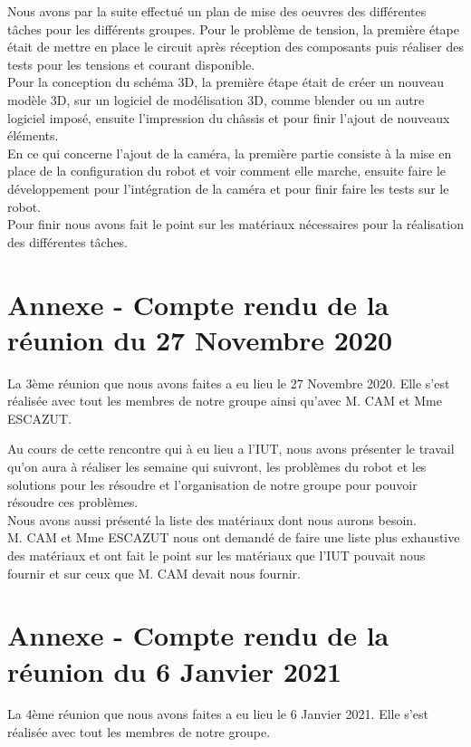 \documentclass{PackagerQualityN}
\begin{document}
Nous avons par la suite effectué un plan de mise des oeuvres des différentes tâches pour les différents groupes.
Pour le problème de tension, la première étape était de mettre en place le circuit après réception des composants puis réaliser des tests pour les tensions et courant disponible.
\\
Pour la conception du schéma 3D, la première étape était de créer un nouveau modèle 3D, sur un logiciel de modélisation 3D, comme blender ou un autre logiciel imposé, ensuite l'impression du châssis et pour finir l'ajout de nouveaux éléments.
\\
En ce qui concerne l'ajout de la caméra, la première partie consiste à la mise en place de la configuration du robot et voir comment elle marche, ensuite faire le développement pour l'intégration de la caméra et pour finir faire les tests sur le robot.
\\
Pour finir nous avons fait le point sur les matériaux nécessaires pour la réalisation des différentes tâches.

\newp
\section*{Annexe - Compte rendu de la réunion du 27 Novembre 2020}
La 3ème réunion que nous avons faites a eu lieu le 27 Novembre 2020. Elle s'est réalisée avec tout les membres de notre groupe ainsi qu'avec M. CAM et Mme ESCAZUT.

Au cours de cette rencontre qui à eu lieu a l'IUT, nous avons présenter le travail qu'on aura à réaliser les semaine qui suivront, les problèmes du robot et les solutions pour les résoudre et l'organisation de notre groupe pour pouvoir résoudre ces problèmes.
\\

Nous avons aussi présenté la liste des matériaux dont nous aurons besoin.
\\

M. CAM et Mme ESCAZUT nous ont demandé de faire une liste plus exhaustive des matériaux et ont fait le point sur les matériaux que l'IUT pouvait nous fournir et sur ceux que M. CAM devait nous fournir.


\newp
\section*{Annexe - Compte rendu de la réunion du 6 Janvier 2021}
La 4ème réunion que nous avons faites a eu lieu le 6 Janvier 2021. Elle s'est réalisée avec tout les membres de notre groupe.
\end{document}
